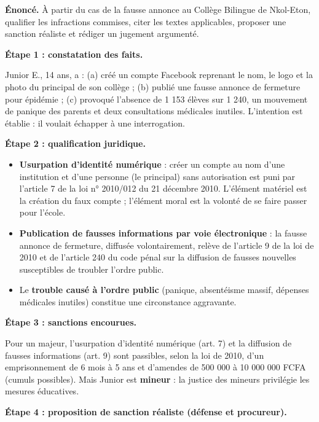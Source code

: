 \documentclass[11pt]{article}
\newcounter{popsec}
\newcounter{popsub}
\newcommand{\courssub}[1]{%
  \stepcounter{popsub}%
  \par\vspace{9pt}\noindent{\popxbold\fontsize{11.5}{13}\selectfont\color{popink}{\color{poporange}\thepopsec.\thepopsub}\hspace{6pt}#1}\par\nopagebreak\vspace{4pt}
}
\begin{document}
\courssub{Démarche et corrigé commenté}

\begin{exoresolu}
\textbf{Énoncé.} À partir du cas de la fausse annonce au Collège Bilingue de Nkol-Eton, qualifier les infractions commises, citer les textes applicables, proposer une sanction réaliste et rédiger un jugement argumenté.

\tcblower

\textbf{Étape 1 : constatation des faits.}

Junior E., 14 ans, a : (a) créé un compte Facebook reprenant le nom, le logo et la photo du principal de son collège ; (b) publié une fausse annonce de fermeture pour épidémie ; (c) provoqué l'absence de 1 153 élèves sur 1 240, un mouvement de panique des parents et deux consultations médicales inutiles. L'intention est établie : il voulait échapper à une interrogation.

\textbf{Étape 2 : qualification juridique.}

\begin{itemize}
\item \textbf{Usurpation d'identité numérique} : créer un compte au nom d'une institution et d'une personne (le principal) sans autorisation est puni par l'article 7 de la loi n° 2010/012 du 21 décembre 2010. L'élément matériel est la création du faux compte ; l'élément moral est la volonté de se faire passer pour l'école.
\item \textbf{Publication de fausses informations par voie électronique} : la fausse annonce de fermeture, diffusée volontairement, relève de l'article 9 de la loi de 2010 et de l'article 240 du code pénal sur la diffusion de fausses nouvelles susceptibles de troubler l'ordre public.
\item Le \textbf{trouble causé à l'ordre public} (panique, absentéisme massif, dépenses médicales inutiles) constitue une circonstance aggravante.
\end{itemize}

\textbf{Étape 3 : sanctions encourues.}

Pour un majeur, l'usurpation d'identité numérique (art. 7) et la diffusion de fausses informations (art. 9) sont passibles, selon la loi de 2010, d'un emprisonnement de 6 mois à 5 ans et d'amendes de 500 000 à 10 000 000 FCFA (cumuls possibles). Mais Junior est \textbf{mineur} : la justice des mineurs privilégie les mesures éducatives.

\textbf{Étape 4 : proposition de sanction réaliste (défense et procureur).}


\end{exoresolu}
\end{document}
